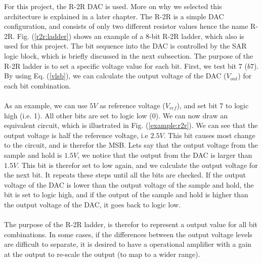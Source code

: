\documentclass[english, 12pt, a4paper]{ifimaster}
\begin{document}
For this project, the R-2R DAC is used. More on why we selected this architecture is explained in a later chapter. The R-2R is a simple DAC configuration, and consists of only two different 
resistor values hence the name R-2R. Fig. (\ref{r2r:ladder}) shows an example of a 8-bit R-2R ladder, which also is used for this project. The bit sequence into the DAC is controlled by the SAR logic
block, which is briefly discussed in the next subsection. The purpose of the R-2R ladder is to set a specific voltage value for each bit. First, we test bit 7 (\(b7\)). By using Eq. (\ref{vlsb}), we 
can calculate the output voltage of the DAC (\(V_{out}\)) for each bit combination.\\
\\
As an example, we can use \(5 V\) as reference voltage (\(V_{ref}\)), and set bit 7 to logic high (i.e. 1). All other bits are set to logic low (0). We can now draw an 
equivalent circuit, which is illustrated in Fig. (\ref{example:r2r}). We can see that the output voltage is half the reference voltage, i.e \(2.5 V\). 
This bit causes most change to the circuit, and is therefor the MSB. Lets say that the output voltage from the sample and hold is \(1.5 V\), we notice that the output from the DAC is larger than \(1.5 V\).
This bit is therefor set to low again, and we calculate the output voltage for the next bit. It repeats these steps until all the bits are checked. If the output voltage of the DAC is lower than the output
voltage of the sample and hold, the bit is set to logic high, and if the output of the sample and hold is higher than the output voltage of the DAC, it goes back to logic low.\\
\\
The purpose of the R-2R ladder, is therefor to represent a output value for all bit combinations. In some cases, if the differences between the output voltage levels are difficult to separate, 
it is desired to have a operational amplifier with a gain at the output to re-scale the output (to map to a wider range). 
\end{document}
